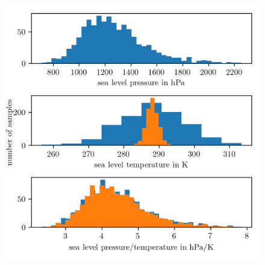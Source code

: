\begin{figure}[ht!]
	\centering
	\includegraphics{SeaLevelHist.png}
	\caption[]{}
	\label{fig:}
\end{figure}